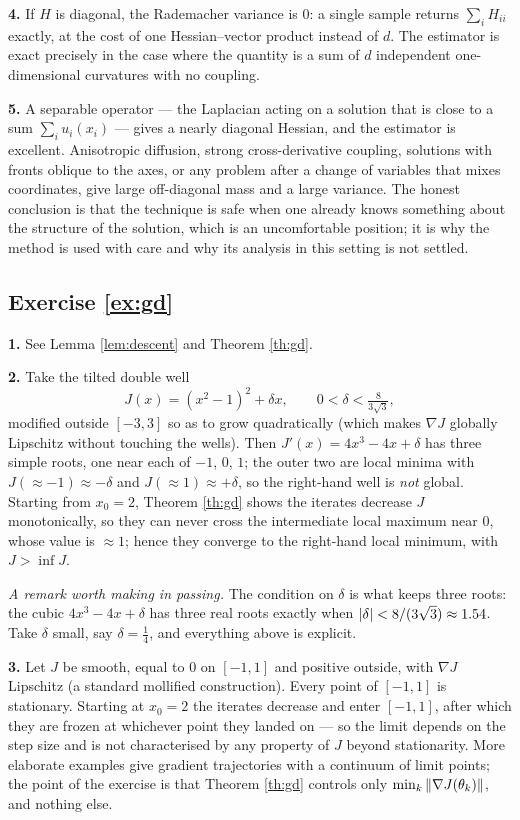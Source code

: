 \documentclass[11pt,a4paper]{article}
\begin{document}
\textbf{4.} If $H$ is diagonal, the Rademacher variance is $0$: a single sample returns
$\sum_i H_{ii}$ exactly, at the cost of one Hessian--vector product instead of $d$. The estimator is
exact precisely in the case where the quantity is a sum of $d$ independent one-dimensional
curvatures with no coupling.

\textbf{5.} A separable operator --- the Laplacian acting on a solution that is close to a sum
$\sum_i u_i(x_i)$ --- gives a nearly diagonal Hessian, and the estimator is excellent. Anisotropic
diffusion, strong cross-derivative coupling, solutions with fronts oblique to the axes, or any
problem after a change of variables that mixes coordinates, give large off-diagonal mass and a large
variance. The honest conclusion is that the technique is safe when one already knows something about
the structure of the solution, which is an uncomfortable position; it is why the method is used with
care and why its analysis in this setting is not settled.

\subsection*{Exercise \ref{ex:gd}}

\textbf{1.} See Lemma \ref{lem:descent} and Theorem \ref{th:gd}.

\textbf{2.} Take the tilted double well
\[
J(x) = (x^2-1)^2 + \delta x, \qquad 0 < \delta < \tfrac{8}{3\sqrt3},
\]
modified outside $[-3,3]$ so as to grow quadratically (which makes $\nabla J$ globally Lipschitz
without touching the wells). Then $J'(x) = 4x^3 - 4x + \delta$ has three simple roots, one near each
of $-1$, $0$, $1$; the outer two are local minima with
$J(\approx -1) \approx -\delta$ and $J(\approx 1)\approx +\delta$, so the right-hand well is
\emph{not} global. Starting from $x_0 = 2$, Theorem \ref{th:gd} shows the iterates decrease $J$
monotonically, so they can never cross the intermediate local maximum near $0$, whose value is
$\approx 1$; hence they converge to the right-hand local minimum, with
$J > \inf J$.

\emph{A remark worth making in passing.} The condition on $\delta$ is what keeps three roots: the
cubic $4x^3-4x+\delta$ has three real roots exactly when $\left\lvert \delta \right\rvert < 8/(3\sqrt3) \approx 1.54$.
Take $\delta$ small, say $\delta = \tfrac14$, and everything above is explicit.

\textbf{3.} Let $J$ be smooth, equal to $0$ on $[-1,1]$ and positive outside, with $\nabla J$
Lipschitz (a standard mollified construction). Every point of $[-1,1]$ is stationary. Starting at
$x_0 = 2$ the iterates decrease and enter $[-1,1]$, after which they are frozen at whichever point
they landed on --- so the limit depends on the step size and is not characterised by any property of
$J$ beyond stationarity. More elaborate examples give gradient trajectories with a continuum of limit
points; the point of the exercise is that Theorem \ref{th:gd} controls only
$\min_k\left\lVert \nabla J(\theta_k) \right\rVert$, and nothing else.
\end{document}
